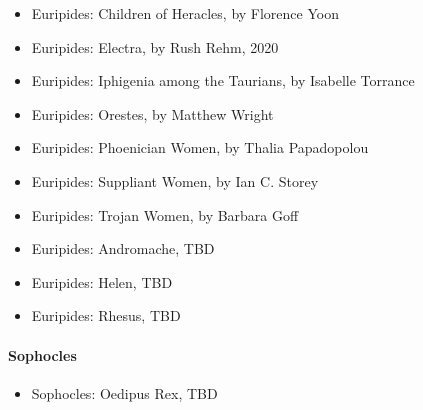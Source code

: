 \documentclass[twocolumn]{article}
\begin{document}
\begin{itemize}

\item Euripides: Children of Heracles, by Florence Yoon
\item Euripides: Electra, by Rush Rehm, 2020
\item Euripides: Iphigenia among the Taurians, by Isabelle Torrance
\item Euripides: Orestes, by Matthew Wright
\item Euripides: Phoenician Women, by Thalia Papadopolou
\item Euripides: Suppliant Women, by Ian C. Storey
\item Euripides: Trojan Women, by Barbara Goff

\medskip

\item Euripides: Andromache, TBD
\item Euripides: Helen, TBD
\item Euripides: Rhesus, TBD

\end{itemize}

\paragraph{Sophocles}

\begin{itemize}


\item Sophocles: Oedipus Rex, TBD

\end{itemize}
\end{document}
